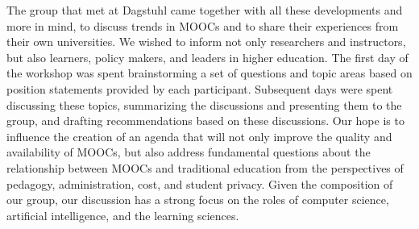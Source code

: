 The group that met at Dagstuhl came together with all these
developments and more in mind, to discuss trends in MOOCs and to share
their experiences from their own universities.  
We wished to inform not only researchers and instructors, but also
learners, policy makers, and leaders in higher education.  The first day
of the workshop was spent brainstorming a set of questions and topic
areas based on position statements provided by each participant.
Subsequent days were spent discussing these topics, summarizing the
discussions and presenting them to the group, and drafting
recommendations based on these discussions.
Our hope is to 
influence the creation of an agenda that will not only improve the
quality and availability of MOOCs,
but also address fundamental questions about the relationship between
MOOCs and traditional education from the perspectives of pedagogy,
administration, cost, and student privacy.
Given the composition of our group, our discussion has a strong focus on the
roles of computer science, artificial intelligence, and the learning sciences.


